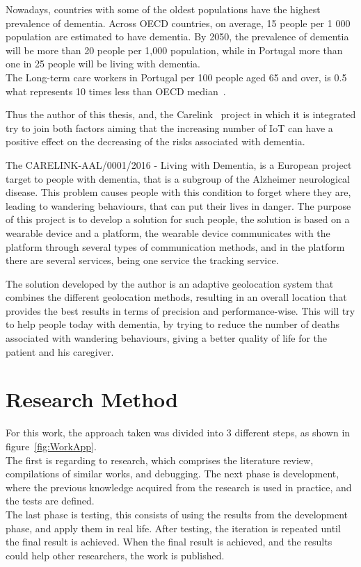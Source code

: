 Nowadays, countries with some of the oldest populations have the highest prevalence of dementia. Across OECD countries, on average, 15 people per 1 000 population are estimated to have dementia. 
By 2050, the prevalence of dementia will be more than 20 people per 1,000 population, while in Portugal more than one in 25 people will be living with dementia.~\cite{oecdcare}
\\The Long-term care workers in Portugal per 100 people aged 65 and over, is  0.5 what represents 10 times less than OECD median~\cite{OECD2019a}.


Thus the author of this thesis, and, the Carelink~\cite{carelink} project in which it is integrated try to join both factors aiming that the increasing number of IoT can have a positive effect on the decreasing of the risks associated with dementia.

The CARELINK-AAL/0001/2016 - Living with Dementia, is a European project target to people with dementia, that is a subgroup of the Alzheimer neurological disease. This problem causes people with this condition to forget where they are, leading to wandering behaviours, that can put their lives in danger.
The purpose of this project is to develop a solution for such people, the solution is based on
a wearable device and a platform, the wearable device communicates with the platform through
several types of communication methods, and in the platform there are several services, being one service the tracking service.

The solution developed by the author is an adaptive geolocation system that combines the different geolocation methods, resulting in an overall location that provides the best results in terms of precision and performance-wise. This will try to help people today with dementia, by trying to reduce the number of deaths associated with wandering behaviours, giving a better quality of life for the patient and his caregiver.






\section{Research Method}
\label{sec:research_method}

For this work, the approach taken was divided into 3 different steps, as shown in figure~\ref{fig:WorkApp}.\\
The first is regarding to research, which comprises the literature review, compilations of similar works, and debugging. The next phase is development, where the previous knowledge acquired from the research is used in practice, and the tests are defined.\\
The last phase is testing, this consists of using the results from the development phase, and apply them in real life. After testing, the iteration is repeated until the final result is achieved. When the final result is achieved, and the results could help other researchers, the work is published.


